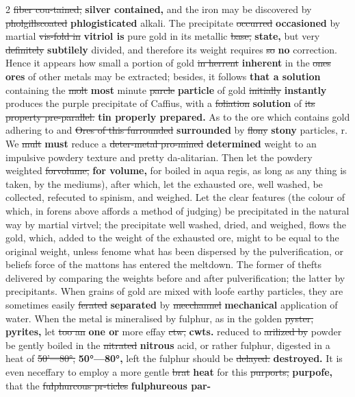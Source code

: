 \documentclass[10pt]{article}
\begin{document}
\begin{multicols}{2}
\sout{fiber cou-tained,} \textbf{silver contained,} and the iron may be discovered by \sout{pholgillscoated} \textbf{phlogisticated} alkali. The precipitate \sout{occurred} \textbf{occasioned} by martial \sout{vis-fold in} \textbf{vitriol is} pure gold in its metallic \sout{base,} \textbf{state,} but very \sout{definitely} \textbf{subtilely} divided, and therefore its weight requires \sout{so} \textbf{no} correction. Hence it appears how small a portion of gold \sout{in herrent} \textbf{inherent} in the \sout{ones} \textbf{ores} of other metals may be extracted; besides, it follows \textbf{that a solution} containing the \sout{molt} \textbf{most} minute \sout{parcle} \textbf{particle} of gold \sout{initially} \textbf{instantly} produces the purple precipitate of Caffius, with a \sout{foliation} \textbf{solution} of \sout{its property pre-parallel.} \textbf{tin properly prepared.} As to the ore which contains gold adhering to and \sout{Ores of this furrounded} \textbf{surrounded} by \sout{flony} \textbf{stony} particles, r. We \sout{mult} \textbf{must} reduce a \sout{deter-metal pro-mined} \textbf{determined} weight to an impulsive powdery texture and pretty da-alitarian. Then let the powdery weighted \sout{forvolume,} \textbf{for volume,} for boiled in aqua regis, as long as any thing is taken, by the mediums), after which, let the exhausted ore, well washed, be collected, refecuted to spinism, and weighed. Let the clear features (the colour of which, in forens above affords a method of judging) be precipitated in the natural way by martial virtvel; the precipitate well washed, dried, and weighed, flows the gold, which, added to the weight of the exhausted ore, might to be equal to the original weight, unless fenome what has been dispersed by the pulverification, or beliefs force of the mattons has entered the meltdown. The former of thefts delivered by comparing the weights before and after pulverification; the latter by precipitants. When grains of gold are mixed with loofe earthy particles, they are sometimes easily \sout{ferated} \textbf{separated} by \sout{mecchannel} \textbf{mechanical} application of water. When the metal is mineralised by fulphur, as in the golden \sout{pyster,} \textbf{pyrites,} let \sout{too an} \textbf{one or} more effay \sout{ctw,} \textbf{cwts.} reduced to \sout{arilized by} powder be gently boiled in the \sout{nitrated} \textbf{nitrous} acid, or rather fulphur, digested in a heat of \sout{50’—80°,} \textbf{50°—80°,} left the fulphur should be \sout{delayed.} \textbf{destroyed.} It is even neceffary to employ a more gentle \sout{brat} \textbf{heat} for this \sout{purports,} \textbf{purpofe,} that the \sout{fulphurcous pr-ticles} \textbf{fulphureous par-}
\end{multicols}
\end{document}
